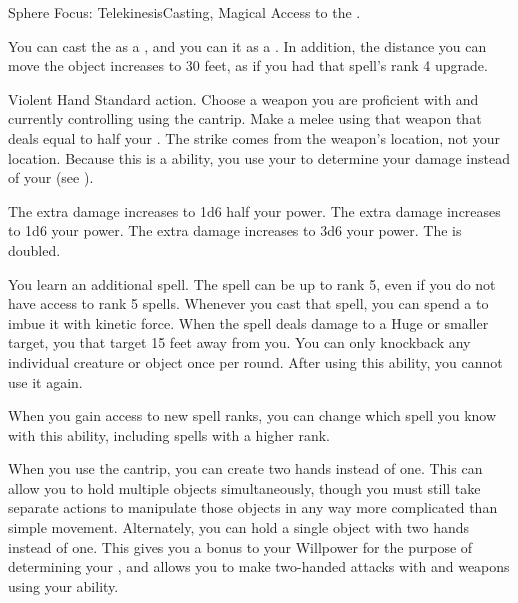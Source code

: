   \begin{magicalfeat}{Sphere Focus: Telekinesis}{Casting, Magical}
    \featpre Access to the  .

     You can cast the   as a , and you can  it as a .
    In addition, the distance you can move the object increases to 30 feet, as if you had that spell's rank 4 upgrade.

    \begin{magicalactiveability}{Violent Hand}
      \abilityusagetime Standard action.
      \rankline
      Choose a weapon you are proficient with and currently controlling using the  cantrip.
      Make a melee  using that weapon that deals  equal to half your .
      The strike comes from the weapon's location, not your location.
      Because this is a \magical ability, you use your  to determine your damage instead of your  (see ).

      \rankline
       The extra damage increases to 1d6 \add half your power.
       The extra damage increases to 1d6 \add your power.
       The extra damage increases to 3d6 \add your power.
       The  is doubled.
    \end{magicalactiveability}

     You learn an additional spell.
    The spell can be up to rank 5, even if you do not have access to rank 5 spells.
    Whenever you cast that spell, you can spend a  to  imbue it with kinetic force.
    When the spell deals damage to a Huge or smaller target, you  that target 15 feet away from you.
    You can only knockback any individual creature or object once per round.
    After using this ability, you  cannot use it again.

    When you gain access to new spell ranks, you can change which spell you know with this ability, including spells with a higher rank.

     When you use the  cantrip, you can create two hands instead of one.
    This can allow you to hold multiple objects simultaneously, though you must still take separate actions to manipulate those objects in any way more complicated than simple movement.
    Alternately, you can hold a single object with two hands instead of one.
    This gives you a  bonus to your Willpower for the purpose of determining your , and allows you to make two-handed attacks with  and  weapons using your  ability.
  \end{magicalfeat}

